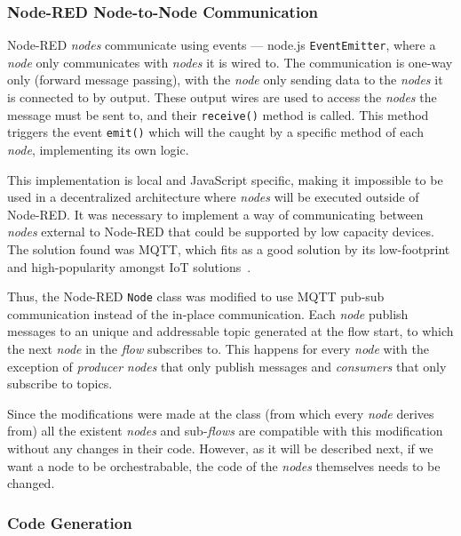 \subsubsection{Node-RED Node-to-Node Communication}\label{sec:mqtt_support}

Node-RED \textit{nodes} communicate using events --- node.js \texttt{EventEmitter}, where a \textit{node} only communicates with \textit{nodes} it is wired to. The communication is one-way only (forward message passing), with the \textit{node} only sending data to the \textit{nodes} it is connected to by output. These output wires are used to access the \textit{nodes} the message must be sent to, and their \texttt{receive()} method is called. This method triggers the event \texttt{emit()} which will the caught by a specific method of each \textit{node}, implementing its own logic.

This implementation is local and JavaScript specific, making it impossible to be used in a decentralized architecture where \textit{nodes} will be executed outside of Node-RED. It was necessary to implement a way of communicating between \textit{nodes} external to Node-RED that could be supported by low capacity devices. The solution found was MQTT, which fits as a good solution by its low-footprint and high-popularity amongst IoT solutions~\cite{soni2017survey}.

Thus, the Node-RED \texttt{Node} class was modified to use MQTT pub-sub communication instead of the in-place communication. Each \textit{node} publish messages to an unique and addressable topic generated at the flow start, to which the next \textit{node} in the \textit{flow} subscribes to. This happens for every \textit{node} with the exception of \textit{producer} \textit{nodes} that only publish messages and \textit{consumers} that only subscribe to topics.

Since the modifications were made at the class (from which every \textit{node} derives from) all the existent \textit{nodes} and sub-\textit{flows} are compatible with this modification without any changes in their code. However, as it will be described next, if we want a node to be orchestrabable, the code of the \textit{nodes} themselves needs to be changed.



\subsubsection{Code Generation}\label{sec:code_generation}

